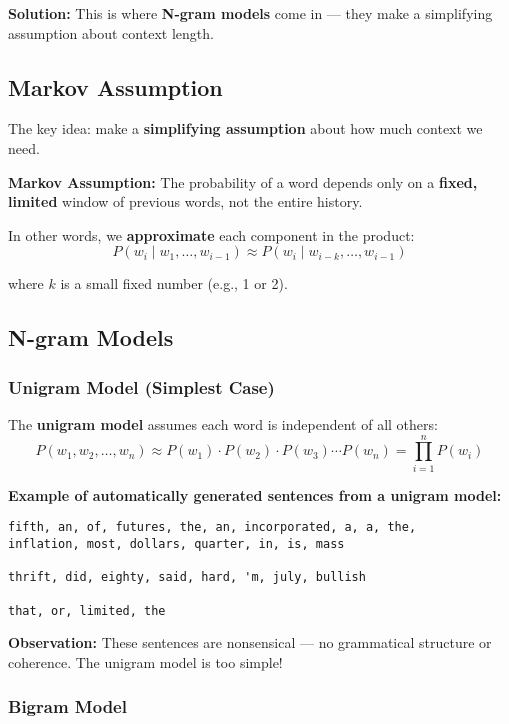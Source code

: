 \documentclass[11pt,a4paper]{article}
\theoremstyle{definition}
\theoremstyle{plain}
\theoremstyle{remark}
\begin{document}
\textbf{Solution:} This is where \textbf{N-gram models} come in — they make a simplifying assumption about context length.

\subsection{Markov Assumption}

The key idea: make a \textbf{simplifying assumption} about how much context we need.

\textbf{Markov Assumption:} The probability of a word depends only on a \textbf{fixed, limited} window of previous words, not the entire history.

In other words, we \textbf{approximate} each component in the product:
\[
P(w_i \mid w_1, \ldots, w_{i-1}) \approx P(w_i \mid w_{i-k}, \ldots, w_{i-1})
\]

where $k$ is a small fixed number (e.g., 1 or 2).

\subsection{N-gram Models}

\subsubsection{Unigram Model (Simplest Case)}

The \textbf{unigram model} assumes each word is independent of all others:
\[
P(w_1, w_2, \ldots, w_n) \approx P(w_1) \cdot P(w_2) \cdot P(w_3) \cdots P(w_n) = \prod_{i=1}^{n} P(w_i)
\]

\textbf{Example of automatically generated sentences from a unigram model:}

\begin{verbatim}
fifth, an, of, futures, the, an, incorporated, a, a, the, 
inflation, most, dollars, quarter, in, is, mass

thrift, did, eighty, said, hard, 'm, july, bullish

that, or, limited, the
\end{verbatim}

\textbf{Observation:} These sentences are nonsensical — no grammatical structure or coherence. The unigram model is too simple!

\subsubsection{Bigram Model}
\end{document}

